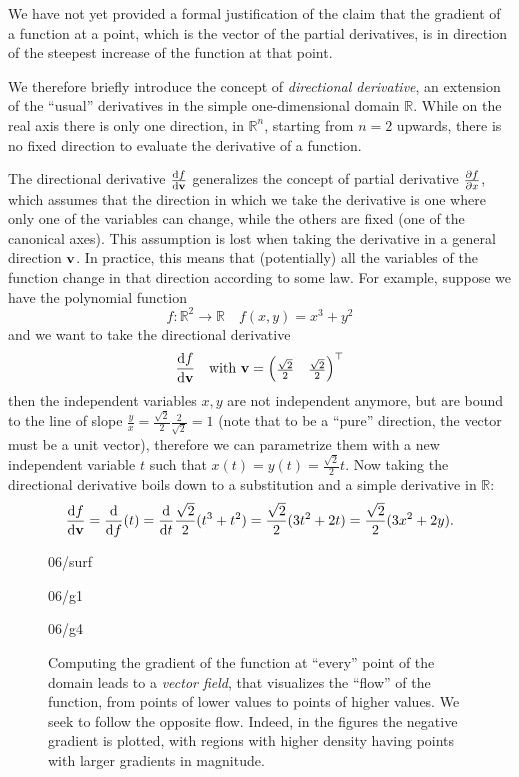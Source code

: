 
We have not yet provided a formal justification of the claim that the gradient of a function at a point, which is the vector of the partial derivatives, is in direction of the steepest increase of the function at that point. 

We therefore briefly introduce the concept of \emph{directional derivative}, an extension of the ``usual'' derivatives in the simple one-dimensional domain $\mathbb{R}$. While on the real axis there is only one direction, in $\mathbb{R}^n$, starting from $n = 2$ upwards, there is no fixed direction to evaluate the derivative of a function. 

The directional derivative $\dv{f}{\vb{v}}$ generalizes the concept of partial derivative $\pdv{f}{x}$, which assumes that the direction in which we take the derivative is one where only one of the variables can change, while the others are fixed (one of the canonical axes). This assumption is lost when taking the derivative in a general direction $\vb{v}$. In practice, this means that (potentially) all the variables of the function change in that direction according to some law. For example, suppose we have the polynomial function
\[
	f: \mathbb{R}^2 \to \mathbb{R} \quad f(x, y) = x^3 + y^2
\]
and we want to take the directional derivative
\[
	\dv{f}{\vb{v}}(x, y) \quad \text{with } \vb{v} = \mqty(\frac{\sqrt{2}}{2} & \frac{\sqrt{2}}{2})^{\top}	
\]
then the independent variables $x, y$ are not independent anymore, but are bound to the line of slope $\frac{y}{x} = \frac{\sqrt{2}}{2} \frac{2}{\sqrt{2}} = 1$ (note that to be a ``pure'' direction, the vector must be a unit vector), therefore we can parametrize them with a new independent variable $t$ such that $x(t) = y(t) = \frac{\sqrt{2}}{2} t$. Now taking the directional derivative boils down to a substitution and a 
simple derivative in $\mathbb{R}$:
\[
	\dv{f}{\vb{v}}(x, y) = \dv{f}(t) = \dv{t} \frac{\sqrt{2}}{2} (t^3 + t^2) = \frac{\sqrt{2}}{2} (3t^2 + 2t) = \frac{\sqrt{2}}{2} (3x^2 + 2y).
\]


\begin{figure}[H]
	\centering
	\begin{overpic}
		[trim=0cm 0cm 0cm 0cm,clip,width=0.31\linewidth]{06/surf}
	\end{overpic}
	\begin{overpic}
		[trim=0cm 0cm 0cm 0cm,clip,width=0.31\linewidth]{06/g1}
	\end{overpic}
	\begin{overpic}
		[trim=0cm 0cm 0cm 0cm,clip,width=0.31\linewidth]{06/g4}
	\end{overpic}
	\caption{Computing the gradient of the function at ``every'' point of the domain leads to a \emph{vector field}, that visualizes the ``flow'' of the function, from points of lower values to points of higher values. We seek to follow the opposite flow. Indeed, in the figures the negative gradient is plotted, with regions with higher density having points with larger gradients in magnitude.}
\end{figure}

